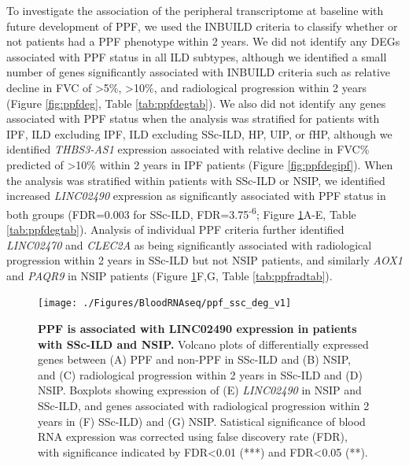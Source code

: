 \documentclass[
]{article}
\begin{document}
To investigate the association of the peripheral transcriptome at baseline with future development of PPF, we used the INBUILD criteria to classify whether or not patients had a PPF phenotype within 2 years. We did not identify any DEGs associated with PPF status in all ILD subtypes, although we identified a small number of genes significantly associated with INBUILD criteria such as relative decline in FVC of \textgreater5\%, \textgreater10\%, and radiological progression within 2 years (Figure \ref{fig:ppfdeg}, Table \ref{tab:ppfdegtab}). We also did not identify any genes associated with PPF status when the analysis was stratified for patients with IPF, ILD excluding IPF, ILD excluding SSc-ILD, HP, UIP, or fHP, although we identified \textit{THBS3-AS1} expression associated with relative decline in FVC\% predicted of \textgreater10\% within 2 years in IPF patients (Figure \ref{fig:ppfdegipf}). When the analysis was stratified within patients with SSc-ILD or NSIP, we identified increased \textit{LINC02490} expression as significantly associated with PPF status in both groups (FDR=0.003 for SSc-ILD, FDR=3.75\textsuperscript{-6}; Figure \ref{fig:sscnsipppf}A-E, Table \ref{tab:ppfdegtab}). Analysis of individual PPF criteria further identified \textit{LINC02470} and \textit{CLEC2A} as being significantly associated with radiological progression within 2 years in SSc-ILD but not NSIP patients, and similarly \textit{AOX1} and \textit{PAQR9} in NSIP patients (Figure \ref{fig:sscnsipppf}F,G, Table \ref{tab:ppfradtab}).



\begin{figure}

{\centering \texttt{[image: ./Figures/BloodRNAseq/ppf\_ssc\_deg\_v1]} 

}

\caption[PPF transcriptome in SSc-ILD and NSIP]{\textbf{PPF is associated with LINC02490 expression in patients with SSc-ILD and NSIP.} Volcano plots of differentially expressed genes between (A) PPF and non-PPF in SSc-ILD and (B) NSIP, and (C) radiological progression within 2 years in SSc-ILD and (D) NSIP. Boxplots showing expression of (E) \textit{LINC02490} in NSIP and SSc-ILD, and genes associated with radiological progression within 2 years in (F) SSc-ILD) and (G) NSIP. Satistical significance of blood RNA expression was corrected using false discovery rate (FDR), with significance indicated by FDR\textless0.01 (***) and FDR\textless0.05 (**).}\label{fig:sscnsipppf}
\end{figure}
\end{document}
